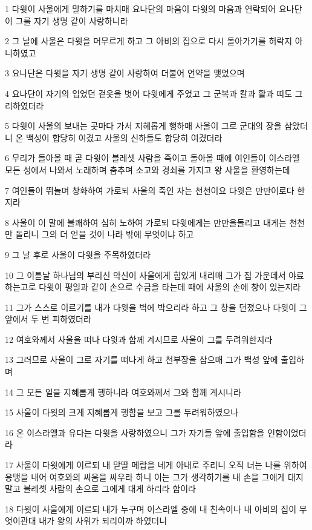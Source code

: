 \par 1 다윗이 사울에게 말하기를 마치매 요나단의 마음이 다윗의 마음과 연락되어 요나단이 그를 자기 생명 같이 사랑하니라
\par 2 그 날에 사울은 다윗을 머무르게 하고 그 아비의 집으로 다시 돌아가기를 허락지 아니하였고
\par 3 요나단은 다윗을 자기 생명 같이 사랑하여 더불어 언약을 맺었으며
\par 4 요나단이 자기의 입었던 겉옷을 벗어 다윗에게 주었고 그 군복과 칼과 활과 띠도 그리하였더라
\par 5 다윗이 사울의 보내는 곳마다 가서 지혜롭게 행하매 사울이 그로 군대의 장을 삼았더니 온 백성이 합당히 여겼고 사울의 신하들도 합당히 여겼더라
\par 6 무리가 돌아올 때 곧 다윗이 블레셋 사람을 죽이고 돌아올 때에 여인들이 이스라엘 모든 성에서 나와서 노래하며 춤추며 소고와 경쇠를 가지고 왕 사울을 환영하는데
\par 7 여인들이 뛰놀며 창화하여 가로되 사울의 죽인 자는 천천이요 다윗은 만만이로다 한지라
\par 8 사울이 이 말에 불쾌하여 심히 노하여 가로되 다윗에게는 만만을돌리고 내게는 천천만 돌리니 그의 더 얻을 것이 나라 밖에 무엇이냐 하고
\par 9 그 날 후로 사울이 다윗을 주목하였더라
\par 10 그 이튿날 하나님의 부리신 악신이 사울에게 힘있게 내리매 그가 집 가운데서 야료하는고로 다윗이 평일과 같이 손으로 수금을 타는데 때에 사울의 손에 창이 있는지라
\par 11 그가 스스로 이르기를 내가 다윗을 벽에 박으리라 하고 그 창을 던졌으나 다윗이 그 앞에서 두 번 피하였더라
\par 12 여호와께서 사울을 떠나 다윗과 함께 계시므로 사울이 그를 두려워한지라
\par 13 그러므로 사울이 그로 자기를 떠나게 하고 천부장을 삼으매 그가 백성 앞에 출입하며
\par 14 그 모든 일을 지혜롭게 행하니라 여호와께서 그와 함께 계시니라
\par 15 사울이 다윗의 크게 지혜롭게 행함을 보고 그를 두려워하였으나
\par 16 온 이스라엘과 유다는 다윗을 사랑하였으니 그가 자기들 앞에 출입함을 인함이었더라
\par 17 사울이 다윗에게 이르되 내 맏딸 메랍을 네게 아내로 주리니 오직 너는 나를 위하여 용맹을 내어 여호와의 싸움을 싸우라 하니 이는 그가 생각하기를 내 손을 그에게 대지 말고 블레셋 사람의 손으로 그에게 대게 하리라 함이라
\par 18 다윗이 사울에게 이르되 내가 누구며 이스라엘 중에 내 친속이나 내 아비의 집이 무엇이관대 내가 왕의 사위가 되리이까 하였더니

